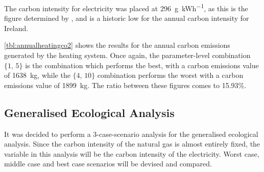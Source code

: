 The carbon intensity for electricity was placed at \qty{296}{\gram\per\kWh}, as this is the figure determined by \citeauthor{seai_energy_2021} \cite{seai_energy_2021}, and is a historic low for the annual carbon intensity for Ireland. 

\cref{tbl:annualheatingco2} shows the results for the annual carbon emissions generated by the heating system. Once again, the parameter-level combination $\{1\text{, }5\}$ is the combination which performs the best, with a carbon emissions value of \qty{1638}{\kilo\gram}, while the $\{4\text{, }10\}$ combination performs the worst with a carbon emissions value of \qty{1899}{\kilo\gram}. The ratio between these figures comes to 15.93\%. 

\begin{table}[htb]
    \footnotesize
    \centering
    \caption{Irish Case Study: Total annual $\text{CO}_2$ emissions from \acs{HHS} [kg]}
    \label{tbl:annualheatingco2}
\end{table}


\subsection{Generalised Ecological Analysis}
It was decided to perform a 3-case-scenario analysis for the generalised ecological analysis. Since the carbon intensity of the natural gas is almost entirely fixed, the variable in this analysis will be the carbon intensity of the electricity. Worst case, middle case and best case scenarios will be devised and compared. 

